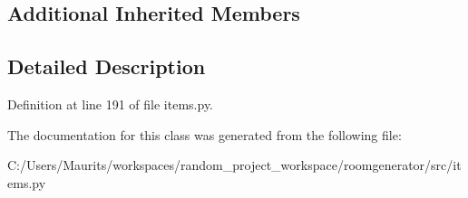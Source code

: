 \subsection*{Additional Inherited Members}


\subsection{Detailed Description}


Definition at line 191 of file items.\+py.



The documentation for this class was generated from the following file\+:\begin{DoxyCompactItemize}
\item 
C\+:/\+Users/\+Maurits/workspaces/random\+\_\+project\+\_\+workspace/roomgenerator/src/items.\+py\end{DoxyCompactItemize}
